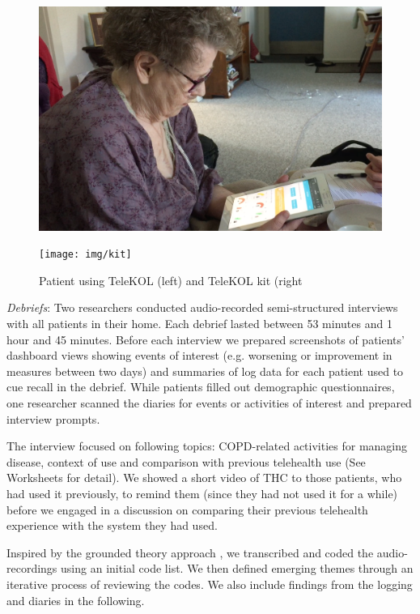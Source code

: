  \begin{figure}[!htb]
 \centering
 \begin{minipage}[b]{0.23\textwidth}
   \includegraphics[width=\textwidth]{img/AL}
 \end{minipage}
 \hfill
 \begin{minipage}[b]{0.23\textwidth}
   \texttt{[image: img/kit]}
 \end{minipage}
  \caption{Patient using TeleKOL (left) and TeleKOL kit (right}
\end{figure}


\textit{Debriefs}: Two researchers conducted audio-recorded semi-structured interviews with all patients in their home. Each debrief lasted between 53 minutes and 1 hour and 45 minutes. Before each interview we prepared screenshots of patients’ dashboard views showing events of interest (e.g. worsening or improvement in measures between two days) and summaries of log data for each patient used to cue recall in the debrief. While patients filled out demographic questionnaires, one researcher scanned the diaries for events or activities of interest and prepared interview prompts. 

The interview focused on following topics: COPD-related activities for managing disease, context of use and comparison with previous telehealth use (See Worksheets for detail). We showed a short video of THC to those patients, who had used it previously, to remind them (since they had not used it for a while) before we engaged in a discussion on comparing their previous telehealth experience with the system they had used. 

Inspired by the grounded theory approach \cite{IDbook}, we transcribed and coded the audio-recordings using an initial code list. We then defined emerging themes through an iterative process of reviewing the codes. We also include findings from the logging and diaries in the following. 

